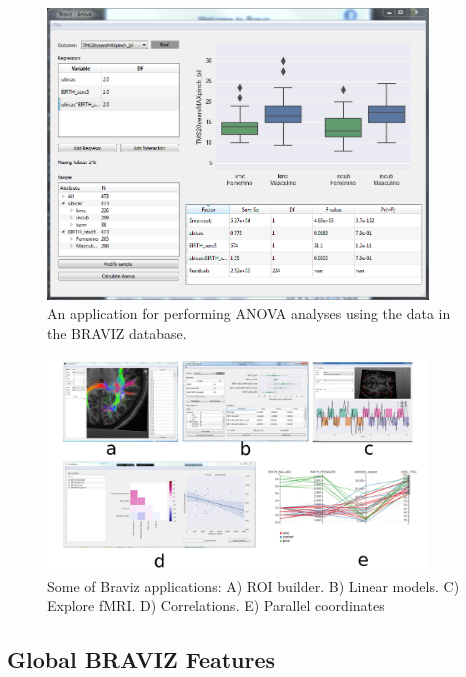 \documentclass[twocolumn]{svjour3} %
\begin{document}
\begin{figure}
\begin{center}
\includegraphics[width=0.9\textwidth]{figures/anova.PNG}
\end{center}
 \caption{\label{fig_anova}An application for performing ANOVA analyses using the data in the BRAVIZ database.}
\end{figure}

\begin{figure}
\begin{center}
\includegraphics[width=0.9\textwidth]{figures/many_apps.png}
\end{center}
 \caption{\label{fig_other_apps} Some of Braviz applications:  A) ROI builder. B) Linear models. C) Explore fMRI. D) Correlations. E) Parallel coordinates}
\end{figure}



\subsection{Global BRAVIZ Features}
\end{document}
